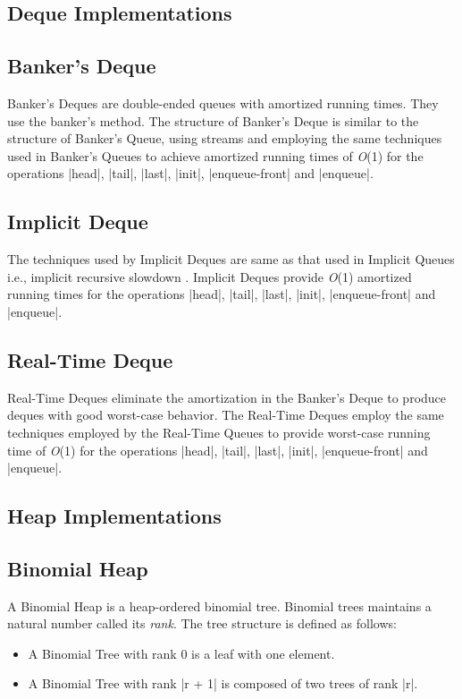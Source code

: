 \subsection{Deque Implementations}

\subsection*{Banker's Deque}
Banker's Deques \cite{oka} are double-ended queues with amortized
running times. They use the banker's method. The structure of Banker's
Deque is similar to the structure of Banker's Queue, using streams and
employing the same techniques used in Banker's Queues to achieve
amortized running times of \emph{O}(1) for the operations \scheme|head|,
\scheme|tail|, \scheme|last|, \scheme|init|, \scheme|enqueue-front| and
\scheme|enqueue|.


\subsection*{Implicit Deque}
The techniques used by Implicit Deques are same as that used in Implicit
Queues i.e., implicit recursive slowdown \citep{oka}. Implicit Deques
provide \emph{O}(1) amortized running times for the operations
\scheme|head|, \scheme|tail|, \scheme|last|, \scheme|init|,
\scheme|enqueue-front| and \scheme|enqueue|.


\subsection*{Real-Time Deque}
Real-Time Deques \citep{oka} eliminate the amortization in the Banker's
Deque to produce deques with good worst-case behavior. The Real-Time
Deques employ the same techniques employed by the Real-Time Queues to
provide worst-case running time of \emph{O}(1) for the operations
\scheme|head|, \scheme|tail|, \scheme|last|, \scheme|init|,
\scheme|enqueue-front| and \scheme|enqueue|.

\subsection{Heap Implementations}

\subsection*{Binomial Heap}
A Binomial Heap \citep{vuillemin, brown} is a heap-ordered binomial
tree. Binomial trees maintains a natural number called its
\emph{rank}. The tree structure is defined as follows:
\begin{itemize}
  \item{A Binomial Tree with rank 0 is a leaf with one element.}

  \item{A Binomial Tree with rank \scheme|r + 1| is composed of two
  trees of rank \scheme|r|.}
\end{itemize}

